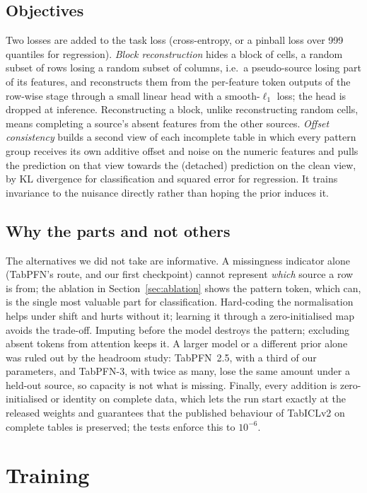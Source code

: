 \documentclass[11pt]{article}
\begin{document}
\subsection{Objectives}

Two losses are added to the task loss (cross-entropy, or a pinball loss over 999
quantiles for regression).
\emph{Block reconstruction} hides a block of cells, a random subset of rows losing a
random subset of columns, i.e.\ a pseudo-source losing part of its features, and
reconstructs them from the per-feature token outputs of the row-wise stage through a
small linear head with a smooth-$\ell_1$ loss; the head is dropped at inference.
Reconstructing a block, unlike reconstructing random cells, means completing a
source's absent features from the other sources.
\emph{Offset consistency} builds a second view of each incomplete table in which every
pattern group receives its own additive offset and noise on the numeric features and
pulls the prediction on that view towards the (detached) prediction on the clean view,
by KL divergence for classification and squared error for regression. It trains
invariance to the nuisance directly rather than hoping the prior induces it.

\subsection{Why the parts and not others}

The alternatives we did not take are informative. A missingness indicator alone
(TabPFN's route, and our first checkpoint) cannot represent \emph{which} source a row
is from; the ablation in Section~\ref{sec:ablation} shows the pattern token, which can,
is the single most valuable part for classification. Hard-coding the normalisation
helps under shift and hurts without it; learning it through a zero-initialised map
avoids the trade-off. Imputing before the model destroys the pattern; excluding absent
tokens from attention keeps it. A larger model or a different prior alone was ruled out
by the headroom study: TabPFN~2.5, with a third of our parameters, and TabPFN-3, with
twice as many, lose the same amount under a held-out source, so capacity is not what
is missing. Finally, every addition is zero-initialised or identity on complete data,
which lets the run start exactly at the released weights and guarantees that the
published behaviour of TabICLv2 on complete tables is preserved; the tests enforce this
to $10^{-6}$.

\section{Training}
\label{sec:training}
\end{document}
